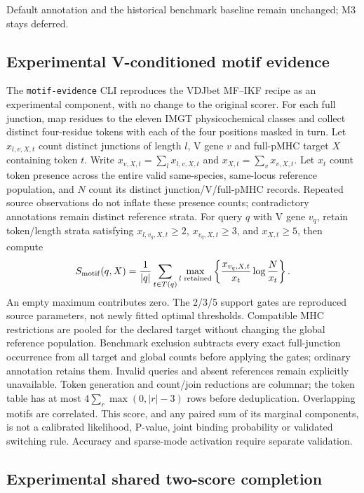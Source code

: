 \documentclass[10pt,a4paper]{article}
\theoremstyle{definition}
\newcommand{\code}[1]{\texttt{\small #1}}
\begin{document}
\noindent Default annotation and the historical benchmark baseline remain unchanged; M3 stays deferred.
\subsection{Experimental V-conditioned motif evidence}
The \code{motif-evidence} CLI reproduces the VDJbet MF--IKF recipe as an
experimental component, with no change to the original scorer. For each full
junction, map residues to the eleven IMGT physicochemical classes and collect
distinct four-residue tokens with each of the four positions masked in turn.
Let $x_{l,v,X,t}$ count distinct junctions of length $l$, V gene $v$ and full-pMHC
target $X$ containing token $t$. Write $x_{v,X,t}=\sum_l x_{l,v,X,t}$ and
$x_{X,t}=\sum_v x_{v,X,t}$. Let $x_t$ count token presence across the entire valid
same-species, same-locus reference population, and $N$ count its distinct
junction/V/full-pMHC records. Repeated source observations do not inflate these
presence counts; contradictory annotations remain distinct reference strata.
For query $q$ with V gene $v_q$, retain token/length strata satisfying
$x_{l,v_q,X,t}\ge2$, $x_{v_q,X,t}\ge3$, and $x_{X,t}\ge5$, then compute
\[
 S_{\rm motif}(q,X)=\frac{1}{|q|}\sum_{t\in T(q)}
 \max_{l\text{ retained}}\left\{\frac{x_{v_q,X,t}}{x_t}
 \log\frac{N}{x_t}\right\}.
\]
An empty maximum contributes zero. The 2/3/5 support gates are reproduced source
parameters, not newly fitted optimal thresholds. Compatible MHC restrictions are
pooled for the declared target without changing the global reference population.
Benchmark exclusion subtracts every exact full-junction occurrence from all
target and global counts before applying the gates; ordinary annotation retains
them. Invalid queries and absent references remain explicitly unavailable.
Token generation and count/join reductions are columnar; the token table has at
most $4\sum_r\max(0,|r|-3)$ rows before deduplication. Overlapping motifs are
correlated. This score, and any paired sum of its marginal components, is not a
calibrated likelihood, P-value, joint binding probability or validated switching
rule. Accuracy and sparse-mode activation require separate validation.

\subsection{Experimental shared two-score completion}
\end{document}

